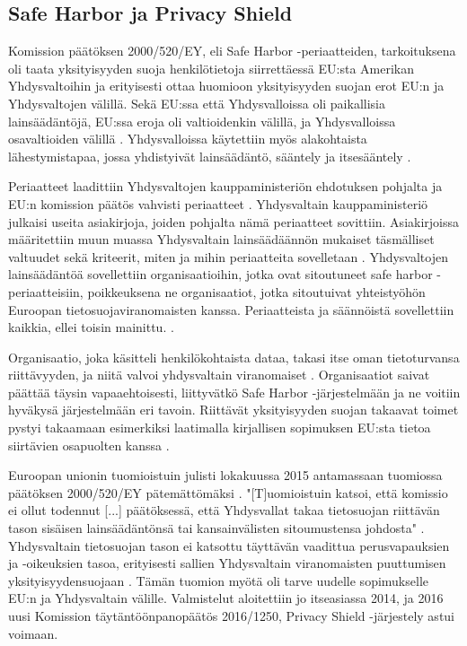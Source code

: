 \documentclass[finnish]{tktltiki}
\begin{document}
\subsection{Safe Harbor ja Privacy Shield}

Komission päätöksen 2000/520/EY, eli Safe Harbor -periaatteiden, tarkoituksena oli taata yksityisyyden suoja henkilötietoja siirrettäessä EU:sta Amerikan Yhdysvaltoihin \cite{safeharbor} ja erityisesti ottaa huomioon yksityisyyden suojan erot EU:n ja Yhdysvaltojen välillä. Sekä EU:ssa että Yhdysvalloissa oli paikallisia lainsäädäntöjä, EU:ssa eroja oli valtioidenkin välillä, ja Yhdysvalloissa osavaltioiden välillä \cite{tikkinen}. Yhdysvalloissa käytettiin myös alakohtaista lähestymistapaa, jossa yhdistyivät lainsäädäntö, sääntely ja itsesääntely \cite{safeharbor}. 

Periaatteet laadittiin Yhdysvaltojen kauppaministeriön ehdotuksen pohjalta \cite{safeharbor,tikkinen}ja EU:n komission päätös vahvisti periaatteet \cite{safeharbor}. Yhdysvaltain kauppaministeriö julkaisi useita asiakirjoja, joiden pohjalta nämä periaatteet sovittiin. Asiakirjoissa määritettiin muun muassa Yhdysvaltain lainsäädäännön mukaiset täsmälliset valtuudet sekä kriteerit, miten ja mihin periaatteita sovelletaan \cite{safeharbor}. Yhdysvaltojen lainsäädäntöä sovellettiin organisaatioihin, jotka ovat sitoutuneet safe harbor -periaatteisiin, poikkeuksena ne organisaatiot, jotka sitoutuivat yhteistyöhön Euroopan tietosuojaviranomaisten kanssa. Periaatteista ja säännöistä sovellettiin kaikkia, ellei toisin mainittu. \cite{safeharbor}.

Organisaatio, joka käsitteli henkilökohtaista dataa, takasi itse oman tietoturvansa riittävyyden, ja niitä valvoi yhdysvaltain viranomaiset \cite{safeharbor,tikkinen}. Organisaatiot saivat päättää täysin vapaaehtoisesti, liittyvätkö Safe Harbor -järjestelmään ja ne voitiin hyväkysä järjestelmään eri tavoin. Riittävät yksityisyyden suojan takaavat toimet pystyi takaamaan esimerkiksi laatimalla kirjallisen sopimuksen EU:sta tietoa siirtävien osapuolten kanssa \cite{safeharbor}.

Euroopan unionin tuomioistuin julisti lokakuussa 2015 antamassaan tuomiossa päätöksen 2000/520/EY pätemättömäksi \cite{privacy}. "[T]uomioistuin katsoi, että komissio ei ollut todennut [...] päätöksessä, että Yhdysvallat takaa tietosuojan riittävän tason sisäisen lainsäädäntönsä tai kansainvälisten sitoumustensa johdosta" \cite{privacy}. Yhdysvaltain tietosuojan tason ei katsottu täyttävän vaadittua perusvapauksien ja -oikeuksien tasoa, erityisesti sallien Yhdysvaltain viranomaisten puuttumisen yksityisyydensuojaan \cite{privacy,tikkinen}. Tämän tuomion myötä oli tarve uudelle sopimukselle EU:n ja Yhdysvaltain välille. Valmistelut aloitettiin jo itseasiassa 2014, ja 2016 uusi Komission täytäntöönpanopäätös 2016/1250, Privacy Shield -järjestely astui voimaan.
\end{document}
